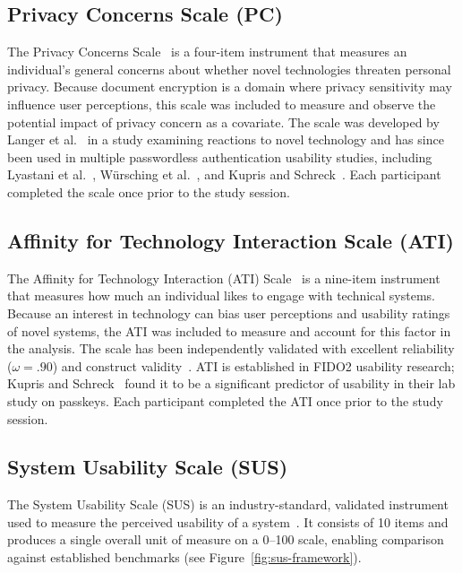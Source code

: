 \subsection{Privacy Concerns Scale (PC)}
\label{sec:pc-scale}

The Privacy Concerns Scale~\cite{langer_information_2018} is a four-item instrument that measures an individual's general concerns about whether novel technologies threaten personal privacy. Because document encryption is a domain where privacy sensitivity may influence user perceptions, this scale was included to measure and observe the potential impact of privacy concern as a covariate. The scale was developed by Langer et al.~\cite{langer_information_2018} in a study examining reactions to novel technology and has since been used in multiple passwordless authentication usability studies, including Lyastani et al.~\cite{lyastani_fido2_2020}, W\"ursching et al.~\cite{wursching_fido2_2023}, and Kupris and Schreck~\cite{kupris_passkey_2026}. Each participant completed the scale once prior to the study session.

\subsection{Affinity for Technology Interaction Scale (ATI)}
\label{sec:ati-scale}

The Affinity for Technology Interaction (ATI) Scale~\cite{franke_personal_2019} is a nine-item instrument that measures how much an individual likes to engage with technical systems. Because an interest in technology can bias user perceptions and usability ratings of novel systems, the ATI was included to measure and account for this factor in the analysis. The scale has been independently validated with excellent reliability ($\omega = .90$) and construct validity~\cite{lezhnina_multimethod_2020}. ATI is established in FIDO2 usability research; Kupris and Schreck~\cite{kupris_passkey_2026} found it to be a significant predictor of usability in their lab study on passkeys. Each participant completed the ATI once prior to the study session.

\subsection{System Usability Scale (SUS)}
\label{sec:sus-scale}

The System Usability Scale (SUS) is an industry-standard, validated instrument used to measure the perceived usability of a system~\cite{brooke_sus_1996}. It consists of 10 items and produces a single overall unit of measure on a 0--100 scale, enabling comparison against established benchmarks (see Figure~\ref{fig:sus-framework}).

